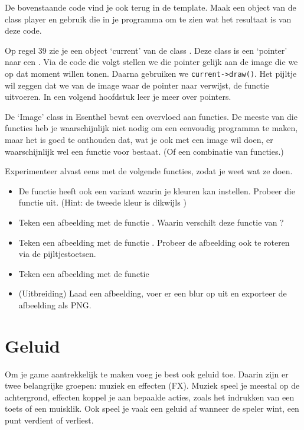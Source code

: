 \begin{exercise}
De bovenstaande code vind je ook terug in de template. Maak een object van de class player en gebruik die in je programma om te zien wat het resultaat is van deze code.
\end{exercise}

\begin{note}
Op regel 39 zie je een object `current' van de class . Deze class is een `pointer' naar een . Via de code die volgt stellen we die pointer gelijk aan de image die we op dat moment willen tonen. Daarna gebruiken we \verb|current->draw()|. Het pijltje wil zeggen dat we van de image waar de pointer naar verwijst, de functie  uitvoeren. In een volgend hoofdstuk leer je meer over pointers.
\end{note}

\begin{exercise}
De `Image' class in Esenthel bevat een overvloed aan functies. De meeste van die functies heb je waarschijnlijk niet nodig om een eenvoudig programma te maken, maar het is goed te onthouden dat, wat je ook met een image wil doen, er waarschijnlijk wel een functie voor bestaat. (Of een combinatie van functies.)

Experimenteer alvast eens met de volgende functies, zodat je weet wat ze doen.

\begin{itemize}
\item De functie  heeft ook een variant waarin je kleuren kan instellen. Probeer die functie uit. (Hint: de tweede kleur is dikwijls )
\item Teken een afbeelding met de functie . Waarin verschilt deze functie van ?
\item Teken een afbeelding met de functie . Probeer de afbeelding ook te roteren via de pijltjestoetsen.
\item Teken een afbeelding met de functie 
\item (Uitbreiding) Laad een afbeelding, voer er een blur op uit en exporteer de afbeelding als PNG.
\end{itemize}
\end{exercise}

\section{Geluid}
Om je game aantrekkelijk te maken voeg je best ook geluid toe. Daarin zijn er twee belangrijke groepen: muziek en effecten (FX). Muziek speel je meestal op de achtergrond, effecten koppel je aan bepaalde acties, zoals het indrukken van een toets of een muisklik. Ook speel je vaak een geluid af wanneer de speler wint, een punt verdient of verliest.

